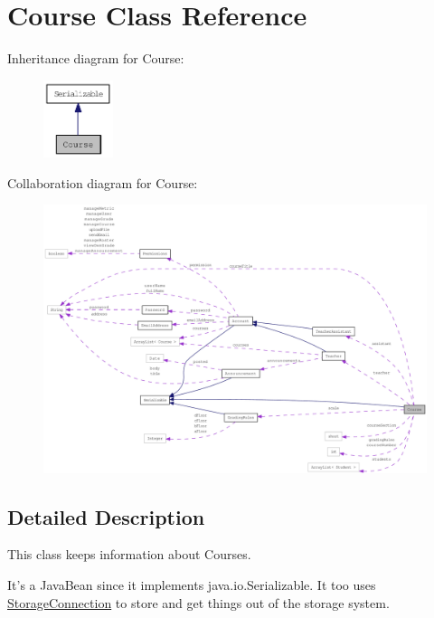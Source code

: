 \hypertarget{classCourse}{
\section{Course Class Reference}
\label{classCourse}
}
Inheritance diagram for Course:\nopagebreak
\begin{figure}[H]
\begin{center}
\leavevmode
\includegraphics[width=58pt]{classCourse__inherit__graph}
\end{center}
\end{figure}
Collaboration diagram for Course:\nopagebreak
\begin{figure}[H]
\begin{center}
\leavevmode
\includegraphics[width=400pt]{classCourse__coll__graph}
\end{center}
\end{figure}


\subsection{Detailed Description}
This class keeps information about Courses. 

It's a JavaBean since it implements java.io.Serializable. It too uses \hyperlink{classStorageConnection}{StorageConnection} to store and get things out of the storage system.

